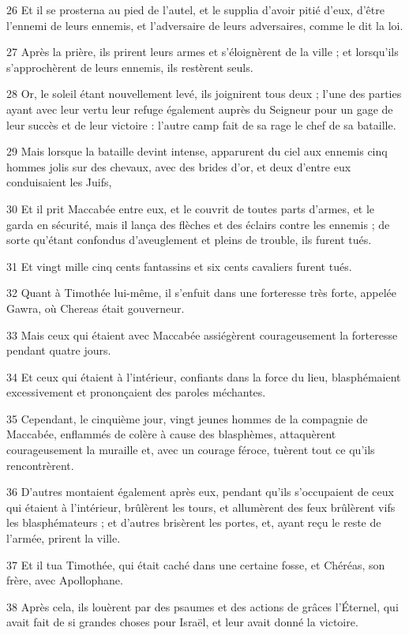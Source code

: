 \par 26 Et il se prosterna au pied de l'autel, et le supplia d'avoir pitié d'eux, d'être l'ennemi de leurs ennemis, et l'adversaire de leurs adversaires, comme le dit la loi.
\par 27 Après la prière, ils prirent leurs armes et s'éloignèrent de la ville ; et lorsqu'ils s'approchèrent de leurs ennemis, ils restèrent seuls.
\par 28 Or, le soleil étant nouvellement levé, ils joignirent tous deux ; l'une des parties ayant avec leur vertu leur refuge également auprès du Seigneur pour un gage de leur succès et de leur victoire : l'autre camp fait de sa rage le chef de sa bataille.
\par 29 Mais lorsque la bataille devint intense, apparurent du ciel aux ennemis cinq hommes jolis sur des chevaux, avec des brides d'or, et deux d'entre eux conduisaient les Juifs,
\par 30 Et il prit Maccabée entre eux, et le couvrit de toutes parts d'armes, et le garda en sécurité, mais il lança des flèches et des éclairs contre les ennemis ; de sorte qu'étant confondus d'aveuglement et pleins de trouble, ils furent tués.
\par 31 Et vingt mille cinq cents fantassins et six cents cavaliers furent tués.
\par 32 Quant à Timothée lui-même, il s'enfuit dans une forteresse très forte, appelée Gawra, où Chereas était gouverneur.
\par 33 Mais ceux qui étaient avec Maccabée assiégèrent courageusement la forteresse pendant quatre jours.
\par 34 Et ceux qui étaient à l'intérieur, confiants dans la force du lieu, blasphémaient excessivement et prononçaient des paroles méchantes.
\par 35 Cependant, le cinquième jour, vingt jeunes hommes de la compagnie de Maccabée, enflammés de colère à cause des blasphèmes, attaquèrent courageusement la muraille et, avec un courage féroce, tuèrent tout ce qu'ils rencontrèrent.
\par 36 D'autres montaient également après eux, pendant qu'ils s'occupaient de ceux qui étaient à l'intérieur, brûlèrent les tours, et allumèrent des feux brûlèrent vifs les blasphémateurs ; et d'autres brisèrent les portes, et, ayant reçu le reste de l'armée, prirent la ville.
\par 37 Et il tua Timothée, qui était caché dans une certaine fosse, et Chéréas, son frère, avec Apollophane.
\par 38 Après cela, ils louèrent par des psaumes et des actions de grâces l'Éternel, qui avait fait de si grandes choses pour Israël, et leur avait donné la victoire.

